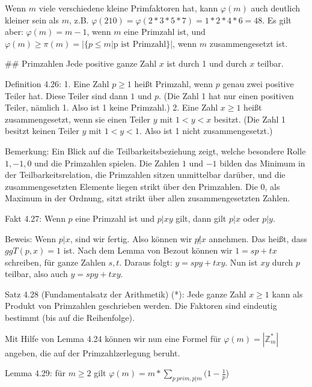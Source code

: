 \documentclass[a4paper]{article}
\begin{document}
\begin{multicols}{3}
    Wenn $m$ viele verschiedene kleine Primfaktoren hat, kann $\varphi(m)$ auch deutlich kleiner sein als $m$, z.B. $\varphi(210) =\varphi(2*3*5*7)=1*2*4*6=48$. Es gilt aber: $\varphi(m) =m-1$, wenn $m$ eine Primzahl ist, und $\varphi(m)\geq \pi(m) =|\{p\leq m|\text{p ist Primzahl}\}|$, wenn $m$ zusammengesetzt ist.

    ## Primzahlen
    Jede positive ganze Zahl $x$ ist durch 1 und durch $x$ teilbar.

    Definition 4.26:
    1. Eine Zahl $p\geq 1$ heißt Primzahl, wenn $p$ genau zwei positive Teiler hat. Diese Teiler sind dann $1$ und $p$. (Die Zahl 1 hat nur einen positiven Teiler, nämlich 1. Also ist 1 keine Primzahl.)
    2. Eine Zahl $x\geq 1$ heißt zusammengesetzt, wenn sie einen Teiler $y$ mit $1<y < x$ besitzt. (Die Zahl 1 besitzt keinen Teiler $y$ mit $1<y<1$. Also ist 1 nicht zusammengesetzt.)

    Bemerkung: Ein Blick auf die Teilbarkeitsbeziehung zeigt, welche besondere Rolle $1,-1, 0$ und die Primzahlen spielen. Die Zahlen $1$ und $-1$ bilden das Minimum in der Teilbarkeitsrelation, die Primzahlen sitzen unmittelbar darüber, und die zusammengesetzten Elemente liegen strikt über den Primzahlen. Die $0$, als Maximum in der Ordnung, sitzt strikt über allen zusammengesetzten Zahlen.

    Fakt 4.27: Wenn $p$ eine Primzahl ist und $p|xy$ gilt, dann gilt $p|x$ oder $p|y$.

    Beweis: Wenn $p|x$, sind wir fertig. Also können wir $p\not|x$ annehmen. Das heißt, dass $ggT(p,x) = 1$ ist. Nach dem Lemma von Bezout können wir $1 =sp+tx$ schreiben, für ganze Zahlen $s,t$. Daraus folgt: $y=spy+txy$. Nun ist $xy$ durch $p$ teilbar, also auch $y=spy+txy$.

    Satz 4.28 (Fundamentalsatz der Arithmetik) (*): Jede ganze Zahl $x\geq 1$ kann als Produkt von Primzahlen geschrieben werden. Die Faktoren sind eindeutig bestimmt (bis auf die Reihenfolge).

    Mit Hilfe von Lemma 4.24 können wir nun eine Formel für $\varphi(m) =|\mathbb{Z}^*_m|$ angeben, die auf der Primzahlzerlegung beruht.

    Lemma 4.29: für $m\geq 2$ gilt $\varphi(m)=m*\sum_{p\ prim, p|m} (1-\frac{1}{p}$)


\end{multicols}
\end{document}

